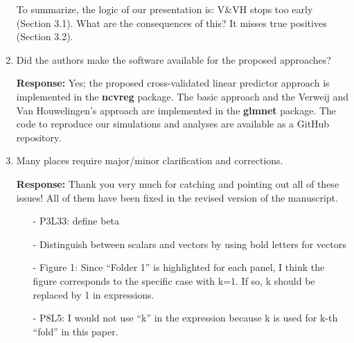 \documentclass[12]{article}
\newcommand{\re}{\textbf{Response: }}
\newcommand{\bbeta}{\boldsymbol{\beta}}
\begin{document}
\begin{enumerate}[align = left]
  To summarize, the logic of our presentation is: V\&VH stops too early (Section 3.1). What are the consequences of this? It misses true positives (Section 3.2).
  
\item Did the authors make the software available for the proposed approaches?

\re Yes; the proposed cross-validated linear predictor approach is implemented in the \textbf{ncvreg} package. The basic approach and the Verweij and Van Houwelingen's approach are implemented in the \textbf{glmnet} package. The code to reproduce our simulations and analyses are available as a GitHub repository.

\item Many places require major/minor clarification and corrections.

  \re Thank you very much for catching and pointing out all of these issues! All of them have been fixed in the revised version of the manuscript.

\begin{itemize}[align = left]
\item[-]  P3L33: define beta


\item[-] Distinguish between scalars and vectors by using bold letters for vectors


\item[-] Figure 1: Since “Folder 1” is highlighted for each panel, I think the figure corresponds to the specific case with k=1. If so, k should be replaced by 1 in expressions.


\item[-]  P8L5: I would not use “k” in the expression because k is used for k-th “fold” in this paper.



\end{itemize}
\end{enumerate}
\end{document}
